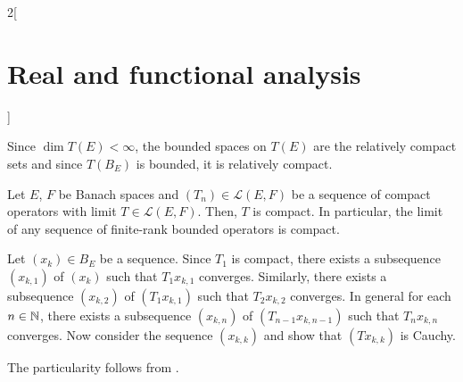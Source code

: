 \documentclass[../../../main_math.tex]{subfiles}
\begin{document}
\begin{multicols}{2}[\section{Real and functional analysis}]
\begin{sproof}
    Since $\dim T(E)<\infty$, the bounded spaces on $T(E)$ are the relatively compact sets and since $T(B_E)$ is bounded, it is relatively compact.
  \end{sproof}
  \begin{proposition}
    Let $E$, $F$ be Banach spaces and $(T_n)\in\mathcal{L}(E,F)$ be a sequence of compact operators with limit $T\in\mathcal{L}(E,F)$. Then, $T$ is compact. In particular, the limit of any sequence of finite-rank bounded operators is compact.
  \end{proposition}
  \begin{sproof}
    Let $(x_k)\in B_E$ be a sequence. Since $T_1$ is compact, there exists a subsequence $(x_{k,1})$ of $(x_k)$ such that $T_1x_{k,1}$ converges. Similarly,  there exists a subsequence $(x_{k,2})$ of $(T_1x_{k,1})$ such that $T_2x_{k,2}$ converges. In general for each $n\in\mathbb{N}$, there exists a subsequence $(x_{k,n})$ of $(T_{n-1}x_{k,n-1})$ such that $T_nx_{k,n}$ converges. Now consider the sequence $(x_{k,k})$ and show that $(Tx_{k,k})$ is Cauchy.

    The particularity follows from .
  \end{sproof}

\end{multicols}
\end{document}
